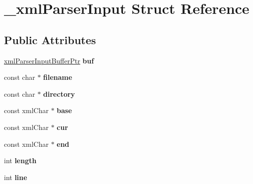 \hypertarget{struct__xml_parser_input}{}\section{\+\_\+xml\+Parser\+Input Struct Reference}
\label{struct__xml_parser_input}
\subsection*{Public Attributes}
\begin{DoxyCompactItemize}
\item 
\mbox{\label{struct__xml_parser_input_ab50ed3b4b2f13d9c298d901395dfa531}} 
\mbox{\hyperlink{struct__xml_parser_input_buffer}{xml\+Parser\+Input\+Buffer\+Ptr}} {\bfseries buf}
\item 
\mbox{\label{struct__xml_parser_input_a3536fa06529d1a11fdc4458b00d2680c}} 
const char $\ast$ {\bfseries filename}
\item 
\mbox{\label{struct__xml_parser_input_adaf128e5827e8a2851f8c2247983affc}} 
const char $\ast$ {\bfseries directory}
\item 
\mbox{\label{struct__xml_parser_input_ab2b245c3945ad6ad057f6a625350d282}} 
const xml\+Char $\ast$ {\bfseries base}
\item 
\mbox{\label{struct__xml_parser_input_afc89c81a4d16f75444fb03a77b03df65}} 
const xml\+Char $\ast$ {\bfseries cur}
\item 
\mbox{\label{struct__xml_parser_input_ab1cd43c8dae0a799db05df0c07c51030}} 
const xml\+Char $\ast$ {\bfseries end}
\item 
\mbox{\label{struct__xml_parser_input_a12d4752740620b43cc8fd64d13a7f91d}} 
int {\bfseries length}
\item 
\mbox{\label{struct__xml_parser_input_a52689e7ee99ea4f70fea0da521371d43}} 
int {\bfseries line}
\item 
\mbox{\label{struct__xml_parser_input_a9be0a6d559062188aec7158b94cdde29}} 

\end{DoxyCompactItemize}
